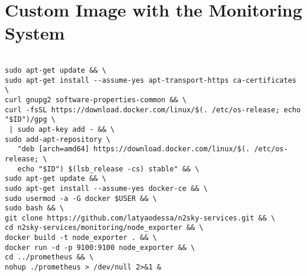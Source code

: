 \section{Custom Image with the Monitoring System}\label{D}

 \begin{lstlisting}

sudo apt-get update && \
sudo apt-get install --assume-yes apt-transport-https ca-certificates \
curl gnupg2 software-properties-common && \
curl -fsSL https://download.docker.com/linux/$(. /etc/os-release; echo "$ID")/gpg \
 | sudo apt-key add - && \
sudo add-apt-repository \
   "deb [arch=amd64] https://download.docker.com/linux/$(. /etc/os-release; \
   echo "$ID") $(lsb_release -cs) stable" && \
sudo apt-get update && \
sudo apt-get install --assume-yes docker-ce && \
sudo usermod -a -G docker $USER && \
sudo bash && \
git clone https://github.com/latyaodessa/n2sky-services.git && \
cd n2sky-services/monitoring/node_exporter && \
docker build -t node_exporter . && \
docker run -d -p 9100:9100 node_exporter && \
cd ../prometheus && \
nohup ./prometheus > /dev/null 2>&1 &

\end{lstlisting}



    
